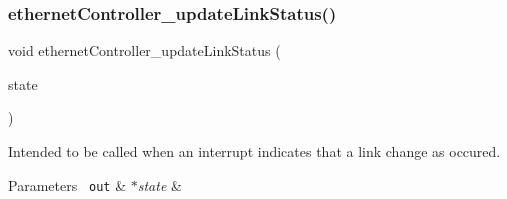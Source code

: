 \subsubsection{\texorpdfstring{ethernetController\_updateLinkStatus()}{ethernetController\_updateLinkStatus()}}
{\footnotesize\ttfamily void ethernet\+Controller\+\_\+update\+Link\+Status (\begin{DoxyParamCaption}\item[{\mbox{\hyperlink{group__ethernet_gae7b6008a02816680c2e3a1e3d2451a60}{ethernet\+Connection\+\_\+t}} $\ast$}]{state }\end{DoxyParamCaption})}



Intended to be called when an interrupt indicates that a link change as occured. 


\begin{DoxyParams}[1]{Parameters}
\mbox{\texttt{ out}}  & {\em $\ast$state} & \\
\hline
\end{DoxyParams}
